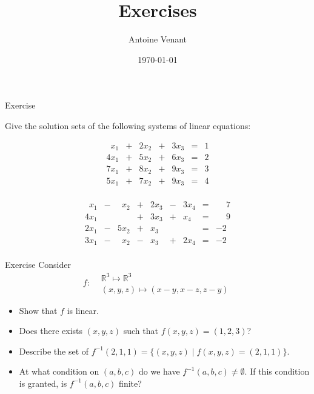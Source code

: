 \documentclass{beamer}
\begin{document}
\title{Exercises} 
\author{Antoine Venant}
\date{\today}
\maketitle


\begin{frame}{Exercise}

  Give the solution sets of the following systems of linear equations:

  \[
  \begin{array}{ccccccc}
     \phantom{1}x_1 & + & 2x_2 & + & 3x_3 & = & 1\\
    4x_1 & + & 5x_2 & + & 6x_3 & = & 2\\
    7x_1 & + & 8x_2 & + & 9x_3 & = & 3\\
    5x_1 & + & 7x_2 & + & 9x_3 & = & 4\\
  \end{array}
  \]


  \[
  \begin{array}{ccccccccc}
     \phantom{1}x_1 & - & \phantom{1}x_2 & + & 2x_3 & - &3x_4& = & \phantom{-}7\\
     4x_1 &  &  & + & 3x_3 & + &x_4& = & \phantom{-}9\\
     2x_1 & - & 5x_2 & + & x_3 &  & & = & -2\\
     3x_1 & - & \phantom{1}x_2 & - & x_3 & + &2x_4& = & -2\\
  \end{array}
  \]
  
\end{frame}


\begin{frame}{Exercise}
  Consider \[f: \begin{aligned} &\mathbb{R}^3 \mapsto \mathbb{R}^3\\&(x,y,z) \mapsto (x-y, x-z, z-y) \end{aligned}\]
    \begin{itemize}
    \item Show that $f$ is linear.
    \item Does there exists $(x,y,z)$ such that $f(x,y,z) = (1, 2, 3)$?
    \item Describe the set of $f^{-1}(2,1,1) = \{(x,y,z) \mid f(x,y,z) = (2,1,1)\}$.
    \item At what condition on $(a,b,c)$ do we have $f^{-1}(a,b,c) \neq \emptyset$. If this condition is granted, is $f^{-1}(a,b,c)$ finite?
    \end{itemize}
\end{frame}
\end{document}
